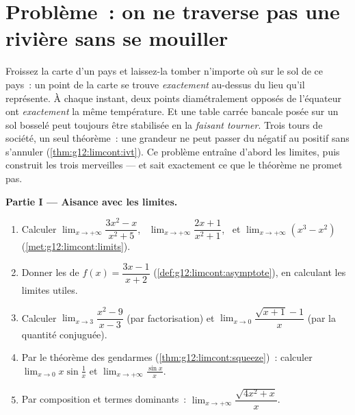 \section{Problème~: on ne traverse pas une rivière sans se mouiller}

\begin{problem}
\label{pb:g12:limcont:1}
Froissez la carte d'un pays et laissez-la tomber n'importe où sur le
sol de ce pays~: un point de la carte se trouve \emph{exactement}
au-dessus du lieu qu'il représente. À chaque instant, deux points
diamétralement opposés de l'équateur ont \emph{exactement} la même
température. Et une table carrée bancale posée sur un sol bosselé
peut toujours être stabilisée en la \emph{faisant tourner}. Trois
tours de société, un seul théorème~: une grandeur  ne peut
passer du négatif au positif sans s'annuler
(\cref{thm:g12:limcont:ivt}). Ce problème entraîne d'abord les
limites, puis construit les trois merveilles --- et sait exactement
ce que le théorème ne promet pas.

\medskip
\noindent\textbf{Partie I --- Aisance avec les limites.}
\begin{enumerate}
  \item Calculer $\lim_{x \to +\infty} \dfrac{3x^2 - x}{x^2 + 5}$,
        \ $\lim_{x \to +\infty} \dfrac{2x + 1}{x^2 + 1}$, \ et
        $\lim_{x \to +\infty} (x^3 - x^2)$
        (\cref{met:g12:limcont:limits}).
  \item Donner les  de $f(x) = \dfrac{3x - 1}{x + 2}$
        (\cref{def:g12:limcont:asymptote}), en calculant les limites
        utiles.
  \item Calculer $\lim_{x \to 3} \dfrac{x^2 - 9}{x - 3}$ (par
        factorisation) et
        $\lim_{x \to 0} \dfrac{\sqrt{x + 1} - 1}{x}$ (par la
        quantité conjuguée).
  \item Par le théorème des gendarmes
        (\cref{thm:g12:limcont:squeeze})~: calculer
        $\lim_{x \to 0} x \sin\frac1x$ et
        $\lim_{x \to +\infty} \frac{\sin x}{x}$.
  \item Par composition et termes dominants~:
        $\lim_{x \to +\infty} \dfrac{\sqrt{4x^2 + x}}{x}$.
\end{enumerate}


\end{problem}
